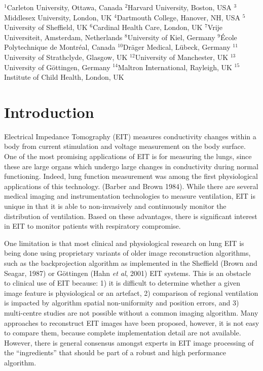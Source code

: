 \documentclass[letterpaper,twocolumn,10pt]{article}
\newcommand{\etal}{{\em et al}}
\begin{document}

{\small
\noindent 
 $^{1}$Carleton University, Ottawa, Canada
 $^{2}$Harvard University, Boston, USA
 $^{3}$Middlesex University, London, UK
 $^{4}$Dartmouth College, Hanover, NH, USA
 $^{5}$University of Sheffield, UK
 $^{6}$Cardinal Health Care, London, UK
 $^{7}$Vrije Universiteit, Amsterdam, Netherlands
 $^{8}$University of Kiel, Germany
 $^{9}$\'Ecole Polytechnique de Montr\'eal, Canada
$^{10}$Dr\"ager Medical, L\"ubeck, Germany
$^{11}$University of Strathclyde, Glasgow, UK
$^{12}$University of Manchester, UK
$^{13}$University of G\"ottingen, Germany
$^{14}$Maltron International, Rayleigh, UK
$^{15}$Institute of Child Health, London, UK
}

\section{Introduction}
Electrical Impedance Tomography (EIT) measures conductivity
changes within a body from current stimulation and voltage
measurement on the body surface. One of the most promising
applications of EIT is for measuring the lungs, since these
are large organs which undergo large changes in conductivity
during normal functioning. Indeed, lung function measurement
was among the first physiological applications of this technology.
(Barber and Brown 1984).
While there are several medical imaging and instrumentation
technologies to measure ventilation, EIT is unique in that it
is able to non-invasively and continuously monitor the distribution of 
ventilation. Based on these advantages, there is significant
interest in EIT to 
monitor patients with respiratory compromise.

One limitation is that most clinical and physiological research
on lung EIT is being done using proprietary variants of
older image reconstruction algorithms, such as the backprojection
algorithm as implemented
in the Sheffield (Brown and Seagar, 1987)
or G\"ottingen (Hahn \etal, 2001) EIT systems.
This is an obstacle to clinical use of EIT because:
1) it is difficult to determine whether a given image feature is 
physiological or an artefact,
2) comparison of regional ventilation is impacted by
algorithm spatial non-uniformity and position errors,
and 
3) multi-centre studies are not possible without a 
common imaging algorithm.
Many approaches to reconstruct EIT images have been proposed,
however, it is not easy to compare them, because 
complete implementation detail are not available.
However, there is general consensus amongst experts
in EIT image processing of the ``ingredients'' that should
be part of a robust and high performance algorithm.
\end{document}

